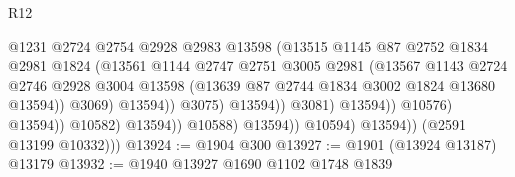 \begin{lexlean}{R12}
\begin{coremodule}
                                              @1231
                                              @2724
                                              @2754
                                              @2928
                                              @2983
                                              @13598
                                              (@13515
                                                @1145
                                                @87
                                                @2752
                                                @1834
                                                @2981
                                                @1824
                                                (@13561
                                                  @1144
                                                  @2747
                                                  @2751
                                                  @3005
                                                  @2981
                                                  (@13567
                                                    @1143
                                                    @2724
                                                    @2746
                                                    @2928
                                                    @3004
                                                    @13598
                                                    (@13639
                                                      @87
                                                      @2744
                                                      @1834
                                                      @3002
                                                      @1824
                                                      @13680
                                                      @13594))
                                                  @3069)
                                                @13594))
                                            @3075)
                                          @13594))
                                      @3081)
                                    @13594))
                                @10576)
                              @13594))
                          @10582)
                        @13594))
                    @10588)
                  @13594))
              @10594)
            @13594))
        (@2591 @13199 @10332)))
@13924 := @1904 @300
@13927 := @1901 (@13924 @13187) @13179
@13932 := @1940 @13927 @1690 @1102 @1748 @1839

\end{coremodule}
\end{lexlean}
